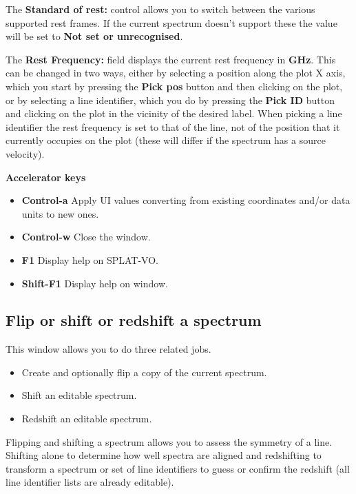 \documentclass[twoside,11pt]{article}
\renewcommand{\_}{\texttt{\symbol{95}}}
\newcommand{\SPLAT}{\textsf{SPLAT-VO}}
\newcommand{\labelitem}[1]{\textbf{#1}}
\newcommand{\subheading}[1]{\textbf{\large{#1}}}
\begin{document}
The \labelitem{Standard of rest:} control allows you to switch between
the various supported rest frames. If the current spectrum doesn't support
these the value will be set to \labelitem{Not set or unrecognised}.

The \labelitem{Rest Frequency:} field displays the current rest frequency in
\labelitem{GHz}. This can be changed in two ways, either by selecting a
position along the plot X axis, which you start by pressing the
\labelitem{Pick pos} button and then clicking on the plot, or by selecting a
line identifier, which you do by pressing the \labelitem{Pick ID} button and
clicking on the plot in the vicinity of the desired label. When picking
a line identifier the rest frequency is set to that of the line, not of the
position that it currently occupies on the plot (these will differ if
the spectrum has a source velocity).

\subheading{Accelerator keys}

\begin{itemize}
\item \labelitem{Control-a} Apply UI values converting from existing
coordinates and/or data units to new ones.

\item \labelitem{Control-w} Close the window.
\item \labelitem{F1} Display help on \SPLAT.
\item \labelitem{Shift-F1} Display help on window.
\end{itemize}


\newpage
\subsection{Flip or shift or redshift a spectrum}

This window allows you to do three related jobs.
\begin{itemize}
\item Create and optionally flip a copy of the current spectrum.
\item Shift an editable spectrum.
\item Redshift an editable spectrum.
\end{itemize}

Flipping and shifting a spectrum allows you to assess the symmetry of a
line. Shifting alone to determine how well spectra are aligned and redshifting
to transform a spectrum or set of line identifiers to guess or confirm the
redshift (all line identifier lists are already editable).
\end{document}

